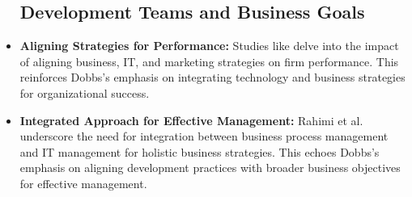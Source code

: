 \documentclass[a4Paper]{article}
\begin{document}
\begin{itemize}
    \subsection{Development Teams and Business Goals}
    \item \textbf{Aligning Strategies for Performance:} Studies like \cite{al2020impact} delve into the impact of aligning business, IT, and marketing strategies on firm performance. This reinforces Dobbs's emphasis on integrating technology and business strategies for organizational success.
    \item \textbf{Integrated Approach for Effective Management:} Rahimi et al. \cite{rahimi2016business} underscore the need for integration between business process management and IT management for holistic business strategies. This echoes Dobbs's emphasis on aligning development practices with broader business objectives for effective management.
\end{itemize}

\pagebreak
\end{document}
